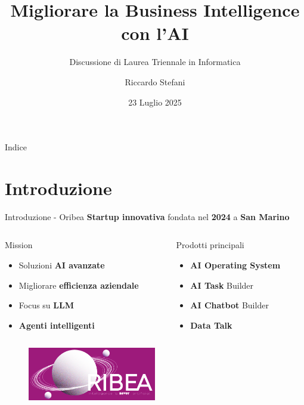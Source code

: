\documentclass{beamer}
\title{Migliorare la Business Intelligence con l'AI}
\subtitle{Discussione di Laurea Triennale in Informatica}
\author{Riccardo Stefani}
\date{23 Luglio 2025}
\begin{document}
	\maketitle

	\begin{frame}{Indice}
		\tableofcontents
	\end{frame}


	\section{Introduzione}

	\begin{frame}{Introduzione - Oribea}
		\textbf{Startup innovativa} fondata nel \textbf{2024} a \textbf{San Marino}

		\begin{columns}
			\begin{column}{0.5\textwidth}
				\begin{alertblock}{Mission}
					\begin{itemize}
						\item Soluzioni \textbf{AI avanzate}
						\item Migliorare \textbf{efficienza aziendale}
						\item Focus su \textbf{LLM}
						\item \textbf{Agenti intelligenti}
					\end{itemize}
				\end{alertblock}
			\end{column}
			\begin{column}{0.5\textwidth}
				\begin{exampleblock}{Prodotti principali}
					\begin{itemize}
						\item \textbf{AI Operating System}
						\item \textbf{AI Task} Builder
						\item \textbf{AI Chatbot} Builder
						\item \textbf{Data Talk}
					\end{itemize}
				\end{exampleblock}
			\end{column}
		\end{columns}

		\begin{figure}[h]
			\centering
			\includegraphics[width=0.5\textwidth]{oribea-logo.png}
		\end{figure}
	\end{frame}
\end{document}
